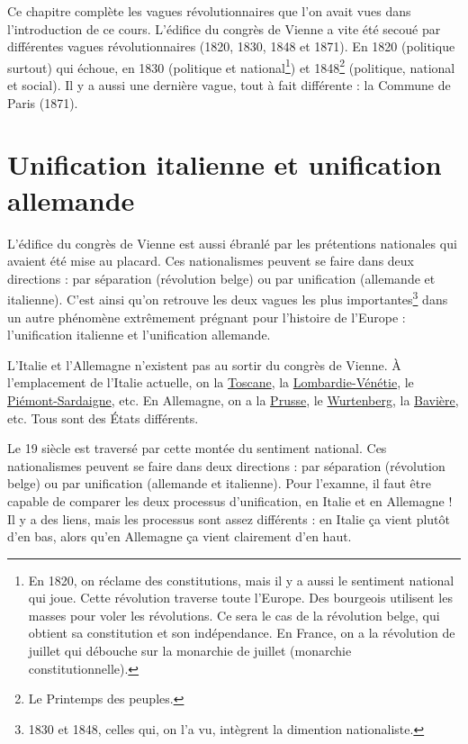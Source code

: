 \documentclass[12pt]{report}
\begin{document}
Ce chapitre complète les vagues révolutionnaires que l'on avait vues dans l'introduction de ce cours.
L'édifice du congrès de Vienne a vite été secoué par différentes vagues révolutionnaires (1820, 1830, 1848 et 1871).
En 1820 (politique surtout) qui échoue, en 1830 (politique et national\footnote{En 1820, on réclame des constitutions, mais il y a aussi le sentiment national qui joue. Cette révolution traverse toute l'Europe. Des bourgeois utilisent les masses pour voler les révolutions. Ce sera le cas de la révolution belge, qui obtient sa constitution et son indépendance. En France, on a la révolution de juillet qui débouche sur la monarchie de juillet (monarchie constitutionnelle).}) et 1848\footnote{Le Printemps des peuples.} (politique, national et social).
Il y a aussi une dernière vague, tout à fait différente : la Commune de Paris (1871).

\section{Unification italienne et unification allemande}

L’édifice du congrès de Vienne est aussi ébranlé par les prétentions nationales qui avaient été mise au placard.
Ces nationalismes peuvent se faire dans deux directions : par séparation (révolution belge) ou par unification (allemande et italienne).
C'est ainsi qu'on retrouve les deux vagues les plus importantes\footnote{1830 et 1848, celles qui, on l'a vu, intègrent la dimention nationaliste.} dans un autre phénomène extrêmement prégnant pour l'histoire de l'Europe : l'unification italienne et l'unification allemande.

L'Italie et l'Allemagne n'existent pas au sortir du congrès de Vienne. 
À l'emplacement de l'Italie actuelle, on la \href{https://fr.wikipedia.org/wiki/Toscane}{Toscane}, la \href{https://fr.wikipedia.org/wiki/Royaume_de_Lombardie-Vénétie}{Lombardie-Vénétie}, le \href{https://fr.wikipedia.org/wiki/Royaume_de_Sardaigne_(1720-1861)}{Piémont-Sardaigne}, etc. 
En Allemagne, on a la \href{https://fr.wikipedia.org/wiki/Royaume_de_Prusse}{Prusse}, le \href{https://fr.wikipedia.org/wiki/Wurtemberg}{Wurtenberg}, la \href{https://fr.wikipedia.org/wiki/Bavière}{Bavière}, etc.
Tous sont des États différents.

Le 19 siècle est traversé par cette montée du sentiment national.
Ces nationalismes peuvent se faire dans deux directions : par séparation (révolution belge) ou par unification (allemande et italienne).
Pour l'examne, il faut être capable de comparer les deux processus d'unification, en Italie et en Allemagne !
Il y a des liens, mais les processus sont assez différents : en Italie ça vient plutôt d'en bas, alors qu'en Allemagne ça vient clairement d'en haut.
\end{document}
